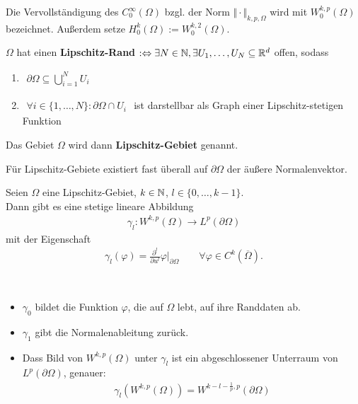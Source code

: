 \begin{definition}
Die Vervollständigung des $C_0^\infty(\Omega)$ bzgl. der Norm $\Vert\cdot\Vert_{k,p,\Omega}$ wird mit $W_0^{k,p}(\Omega)$ bezeichnet. Außerdem setze $H_0^k(\Omega):=W_0^{k,2}(\Omega)$.
\end{definition}

\begin{definition}\enter
$\Omega$ hat einen \textbf{Lipschitz-Rand} $:\Leftrightarrow\exists N\in\mathbb{N},\exists U_1,\ldots,U_N\subseteq\mathbb{R}^d$ offen, sodass
\begin{enumerate}
\item $
\begin{aligned}
\partial\Omega\subseteq\bigcup\limits^N_{i=1} U_i
\end{aligned}$
\item $
\begin{aligned}
\forall i\in\lbrace1,\ldots,N\rbrace:\partial\Omega\cap U_i
\end{aligned}$
 ist darstellbar als Graph einer Lipschitz-stetigen Funktion
\end{enumerate}
Das Gebiet $\Omega$ wird dann \textbf{Lipschitz-Gebiet} genannt.
\end{definition}

\begin{bemerkung}
Für Lipschitz-Gebiete existiert fast überall auf $\partial\Omega$ der äußere Normalenvektor.
\end{bemerkung}

\begin{satz}[Spursatz]\label{satz1.7Spursatz}\enter
Seien $\Omega$ eine Lipschitz-Gebiet, $k\in\mathbb{N}$, $l\in\lbrace 0,\ldots,k-1\rbrace$.\\
Dann gibt es eine stetige lineare Abbildung
\begin{align*}
\gamma_l:W^{k,p}(\Omega)\rightarrow L^p(\partial\Omega)
\end{align*}
mit der Eigenschaft
\begin{align*}
\gamma_l(\varphi)=\frac{\partial^l}{\partial u^l}\varphi|_{\partial\Omega}\qquad\forall\varphi\in C^k(\overline{\Omega}).
\end{align*}
\end{satz}

\begin{bemerkung}\
\begin{itemize}
\item $\gamma_0$ bildet die Funktion $\varphi$, die auf $\Omega$ lebt, auf ihre Randdaten ab.
\item  $\gamma_1$ gibt die Normalenableitung zurück.
\item Dass Bild von $W^{k,p}(\Omega)$ unter $\gamma_l$ ist ein abgeschlossener Unterraum von $L^p(\partial\Omega)$, genauer:
\begin{align*}
\gamma_l\left(W^{k,p}(\Omega)\right)=W^{k-l-\frac{1}{p},p}(\partial\Omega)
\end{align*}
\end{itemize}
\end{bemerkung}

